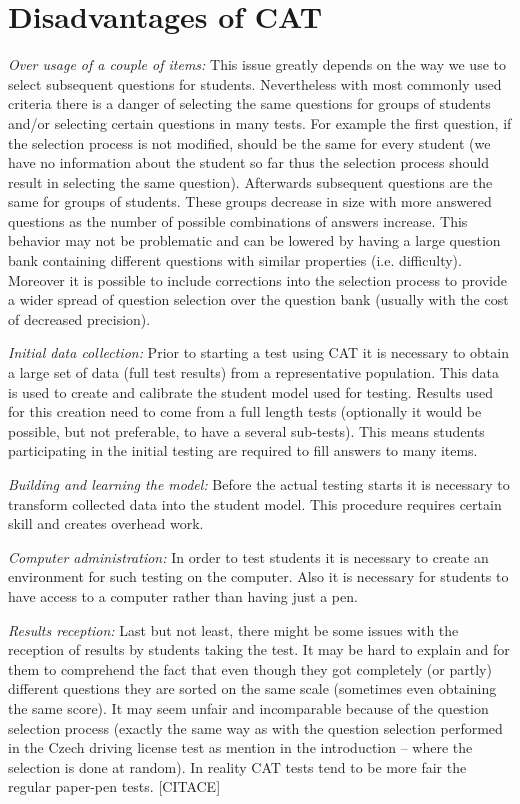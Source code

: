 \section{Disadvantages of CAT}
\emph{Over usage of a couple of items: }This issue greatly depends on the way we use to select subsequent questions for students. Nevertheless with most commonly used criteria there is a danger of selecting the same questions for groups of students and/or selecting certain questions in many tests. For example the first question, if the selection process is not modified, should be the same for every student (we have no information about the student so far thus the selection process should result in selecting the same question). Afterwards subsequent questions are the same for groups of students. These groups decrease in size with more answered questions as the number of possible combinations of answers increase. This behavior may not be problematic and can be lowered by having a large question bank containing different questions with similar properties (i.e. difficulty). Moreover it is possible to include corrections into the selection process to provide a wider spread of question selection over the question bank (usually with the cost of decreased precision).

\emph{Initial data collection:} Prior to starting a test using CAT it is necessary to obtain a large set of data (full test results) from a representative population. This data is used to create and calibrate the student model used for testing. Results used for this creation need to come from a full length tests (optionally it would be possible, but not preferable, to have a several sub-tests). This means students participating in the initial testing are required to fill answers to many items.

\emph{Building and learning the model: }Before the actual testing starts it is necessary to transform collected data into the student model. This procedure requires certain skill and creates overhead work. 

\emph{Computer administration:} In order to test students it is necessary to create an environment for such testing on the computer. Also it is necessary for students to have access to a computer rather than having just a pen.

\emph{Results reception:} Last but not least, there might be some issues with the reception of results by students taking the test. It may be hard to explain and for them to comprehend the fact that even though they got completely (or partly) different questions they are sorted on the same scale (sometimes even obtaining the same score). It may seem unfair and incomparable because of the question selection process (exactly the same way as with the question selection performed in the Czech driving license test as mention in the introduction – where the selection is done at random). In reality CAT tests tend to be more fair the regular paper-pen tests. [CITACE]
